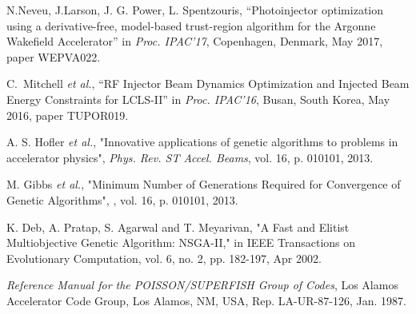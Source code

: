 \documentclass[letterpaper,  %
              ]{jacow-2_3}   %
\begin{document}
\begin{thebibliography}{99}
N.Neveu, J.Larson, J. G. Power, L. Spentzouris, 
“Photoinjector optimization using a derivative-free, model-based trust-region algorithm for the Argonne Wakefield Accelerator”
in \textit{Proc. IPAC’17}, 
Copenhagen, Denmark, May 2017, 
paper WEPVA022.

C.~Mitchell \emph{et al.}, “RF Injector Beam Dynamics Optimization 
and Injected Beam Energy Constraints for LCLS-II”
in \textit{Proc. IPAC’16}, 
Busan, South Korea, May 2016, 
paper TUPOR019.

A. S. Hofler \emph{et al.},
"Innovative applications of genetic algorithms to 
problems in accelerator physics",
\emph{Phys. Rev. ST Accel. Beams}, vol. 16,
p. 010101, 2013.

M. Gibbs \emph{et al.},
"Minimum Number of Generations Required 
for Convergence of Genetic Algorithms",
\emph{}, vol. 16,
p. 010101, 2013.

K. Deb, A. Pratap, S. Agarwal and T. Meyarivan, 
"A Fast and Elitist Multiobjective Genetic Algorithm: NSGA-II," 
in IEEE Transactions on Evolutionary Computation, 
vol. 6, no. 2, pp. 182-197, Apr 2002.








\emph{Reference Manual for the POISSON/SUPERFISH Group of 
	Codes},  Los Alamos Accelerator Code Group,  
 Los Alamos, NM, USA, 
 Rep. LA-UR-87-126, Jan. 1987.
\end{thebibliography}
\end{document}
